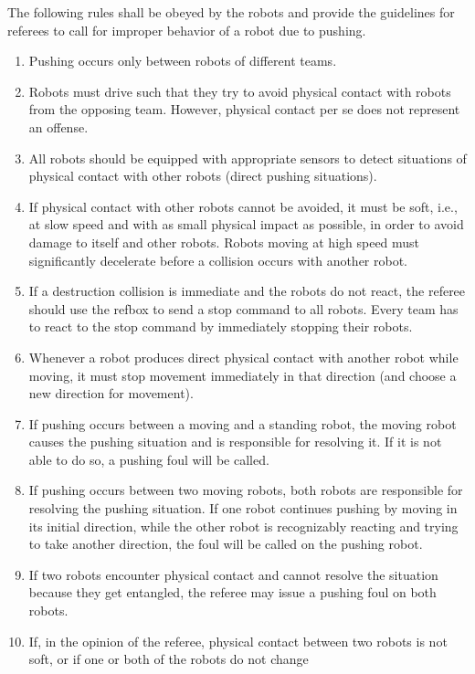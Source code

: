 \documentclass[12pt,twoside]{article}
\begin{document}
The following rules shall be obeyed by the robots and provide the
guidelines for referees to call for improper behavior of a robot due
to pushing.

\begin{enumerate}
\item Pushing occurs only between robots of different teams.
\item Robots must drive such that they try to avoid physical contact
  with robots from the opposing team. However, physical contact per se
  does not represent an offense.
\item All robots should be equipped with appropriate sensors to detect
  situations of physical contact with other robots (direct pushing
  situations).
\item If physical contact with other robots cannot be avoided, it must
  be soft, i.e., at slow speed and with as small physical impact as
  possible, in order to avoid damage to itself and other
  robots. Robots moving at high speed must significantly decelerate
  before a collision occurs with another robot.
\item If a destruction collision is immediate and the robots do not
  react, the referee should use the refbox to send a stop command to
  all robots. Every team has to react to the stop command by
  immediately stopping their robots.
\item Whenever a robot produces direct physical contact with another
  robot while moving, it must stop movement immediately in that
  direction (and choose a new direction for movement).
\item If pushing occurs between a moving and a standing robot, the
  moving robot causes the pushing situation and is responsible for
  resolving it. If it is not able to do so, a pushing foul will be
  called.
\item If pushing occurs between two moving robots, both robots are
  responsible for resolving the pushing situation. If one robot
  continues pushing by moving in its initial direction, while the
  other robot is recognizably reacting and trying to take another
  direction, the foul will be called on the pushing robot.
\item If two robots encounter physical contact and cannot resolve the
  situation because they get entangled, the referee may issue a
  pushing foul on both robots.
\item If, in the opinion of the referee, physical contact between two
  robots is not soft, or if one or both of the robots do not change

\end{enumerate}
\end{document}
